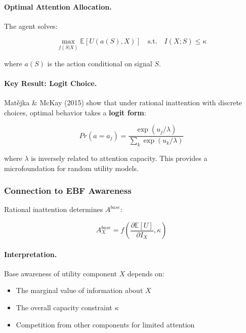 \paragraph{Optimal Attention Allocation.}
The agent solves:

\begin{equation}
\max_{f(S|X)} \mathbb{E}[U(a(S), X)] \quad \text{s.t.} \quad I(X;S) \leq \kappa
\label{eq:ri-optimization}
\end{equation}

where $a(S)$ is the action conditional on signal $S$.

\paragraph{Key Result: Logit Choice.}
Matějka \& McKay (2015) show that under rational inattention with discrete 
choices, optimal behavior takes a \textbf{logit form}:

\begin{equation}
Pr(a = a_j) = \frac{\exp(u_j / \lambda)}{\sum_k \exp(u_k / \lambda)}
\end{equation}

where $\lambda$ is inversely related to attention capacity. This provides a 
microfoundation for random utility models.

\subsubsection{Connection to EBF Awareness}
\label{subsubsec:ri-bcm-connection}

Rational inattention determines $A^{base}$:

\begin{equation}
A^{base}_X = f\left(\frac{\partial \mathbb{E}[U]}{\partial I_X}, \kappa\right)
\end{equation}

\paragraph{Interpretation.}
Base awareness of utility component $X$ depends on:
\begin{itemize}
\item The marginal value of information about $X$
\item The overall capacity constraint $\kappa$
\item Competition from other components for limited attention
\end{itemize}

